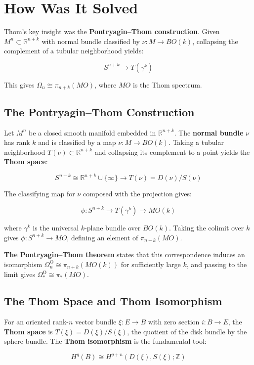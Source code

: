 \section{How Was It Solved}

Thom's key insight was the \textbf{Pontryagin--Thom construction}. Given
$M^n \subset \mathbb{R}^{n+k}$ with normal bundle classified by
$\nu: M \to BO(k)$, collapsing the complement of a tubular neighborhood yields:

\[S^{n+k} \to T(\gamma^k)\]

This gives $\Omega_n \cong \pi_{n+k}(MO)$, where $MO$ is the Thom spectrum.

\subsection{The Pontryagin--Thom Construction}

Let $M^n$ be a closed smooth manifold embedded in $\mathbb{R}^{n+k}$. The
\textbf{normal bundle} $\nu$ has rank $k$ and is classified by a map
$\nu: M \to BO(k)$. Taking a tubular neighborhood $T(\nu) \subset \mathbb{R}^{n+k}$
and collapsing its complement to a point yields the \textbf{Thom space}:

\[S^{n+k} \cong \mathbb{R}^{n+k} \cup \{\infty\} \to T(\nu) = D(\nu)/S(\nu)\]

The classifying map for $\nu$ composed with the projection gives:

\[\phi: S^{n+k} \to T(\gamma^k) \to MO(k)\]

where $\gamma^k$ is the universal $k$-plane bundle over $BO(k)$. Taking the
colimit over $k$ gives $\phi: S^{n+k} \to MO$, defining an element of
$\pi_{n+k}(MO)$.

\textbf{The Pontryagin--Thom theorem} states that this correspondence induces an
isomorphism $\Omega_n^{\text{O}} \cong \pi_{n+k}(MO(k))$ for sufficiently large
$k$, and passing to the limit gives $\Omega_*^{\text{O}} \cong \pi_*(MO)$.

\subsection{The Thom Space and Thom Isomorphism}

For an oriented rank-$n$ vector bundle $\xi: E \to B$ with zero section
$i: B \to E$, the \textbf{Thom space} is $T(\xi) = D(\xi)/S(\xi)$, the quotient
of the disk bundle by the sphere bundle. The \textbf{Thom isomorphism} is the
fundamental tool:

\[H^q(B) \cong H^{q+n}(D(\xi), S(\xi); \mathbb{Z})\]

